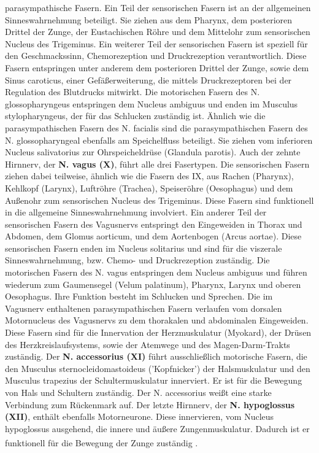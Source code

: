 \documentclass[12pt,a4paper,pdftex]{article}
\begin{document}
parasympathische Fasern. Ein Teil der sensorischen Fasern ist an der allgemeinen Sinneswahrnehmung beteiligt. Sie ziehen aus dem Pharynx, dem posterioren Drittel der Zunge, der Eustachischen Röhre und dem Mittelohr zum sensorischen Nucleus des Trigeminus. Ein weiterer Teil der sensorischen Fasern ist speziell für den Geschmackssinn, Chemorezeption und Druckrezeption verantwortlich. Diese Fasern entspringen unter anderem dem posterioren Drittel der Zunge, sowie dem Sinus caroticus, einer Gefäßerweiterung, die mittels Druckrezeptoren bei der Regulation des Blutdrucks mitwirkt. Die motorischen Fasern des N. glossopharyngeus entspringen dem Nucleus ambiguus und enden im Musculus stylopharyngeus, der für das Schlucken zuständig ist. Ähnlich wie die parasympathischen Fasern des N. facialis sind die parasympathischen Fasern des N. glossopharyngeal ebenfalls am Speichelfluss beteiligt. Sie ziehen vom inferioren Nucleus salivatorius zur Ohrspeicheldrüse (Glandula parotis). Auch der zehnte Hirnnerv, der \textbf{N. vagus (X)}, führt alle drei Fasertypen. Die sensorischen Fasern ziehen dabei teilweise, ähnlich wie die Fasern des IX, aus Rachen (Pharynx), Kehlkopf (Larynx), Luftröhre (Trachea), Speiseröhre (Oesophagus) und dem Außenohr zum sensorischen Nucleus des Trigeminus. Diese Fasern sind funktionell in die allgemeine Sinneswahrnehmung involviert. Ein anderer Teil der sensorischen Fasern des Vagusnervs entspringt den Eingeweiden in Thorax und Abdomen, dem Glomus aorticum, und dem Aortenbogen (Arcus aortae). Diese sensorischen Fasern enden im Nucleus solitarius und sind für die viszerale Sinneswahrnehmung, bzw. Chemo- und Druckrezeption zuständig. Die motorischen Fasern des N. vagus entspringen dem Nucleus ambiguus und führen wiederum zum Gaumensegel (Velum palatinum), Pharynx, Larynx und oberen Oesophagus. Ihre Funktion besteht im Schlucken und Sprechen. Die im Vagusnerv enthaltenen parasympathischen Fasern verlaufen vom dorsalen Motornucleus des Vagusnervs zu dem thorakalen und abdominalen Eingeweiden. Diese Fasern sind für die Innervation der Herzmuskulatur (Myokard), der Drüsen des Herzkreislaufsystems, sowie der Atemwege und des Magen-Darm-Trakts zuständig. Der \textbf{N. accessorius (XI)} führt ausschließlich motorische Fasern, die den Musculus sternocleidomastoideus ('Kopfnicker') der Halsmuskulatur und den Musculus trapezius der Schultermuskulatur innerviert. Er ist für die Bewegung von Hals und Schultern zuständig. Der N. accessorius weißt eine starke Verbindung zum Rückenmark auf. Der letzte Hirnnerv, der \textbf{N. hypoglossus (XII)}, enthält ebenfalls Motorneurone. Diese innervieren, vom Nucleus hypoglossus ausgehend, die innere und äußere Zungenmuskulatur. Dadurch ist er funktionell für die Bewegung der Zunge zuständig \textsuperscript{\cite[10]{crossman2014neuroanatomy}}.
\end{document}
